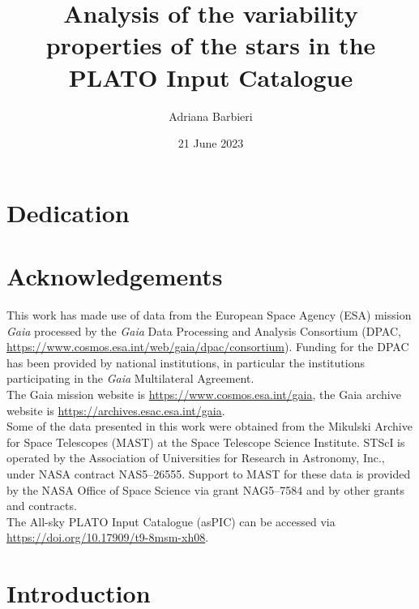 \documentclass[11pt]{report}
\title{Analysis of the variability properties of the stars in the PLATO Input Catalogue}
\author{Adriana Barbieri}
\date{21 June 2023}
\begin{document}





\chapter*{Dedication}




\chapter*{Acknowledgements}



This work has made use of data from the European Space Agency (ESA) mission {\it Gaia} %
processed by the {\it Gaia} Data Processing and Analysis Consortium (DPAC,
\url{https://www.cosmos.esa.int/web/gaia/dpac/consortium}). Funding for the DPAC
has been provided by national institutions, in particular the institutions
participating in the {\it Gaia} Multilateral Agreement.\\
The Gaia mission website is \url{https://www.cosmos.esa.int/gaia}, the Gaia archive website is \url{https://archives.esac.esa.int/gaia}.\\
Some of the data presented in this work were obtained from the Mikulski Archive for Space Telescopes (MAST) at the Space Telescope Science Institute.  STScI is operated by the Association of Universities for Research in Astronomy, Inc., under NASA contract NAS5–26555. Support to MAST for these data is provided by the NASA Office of Space Science via grant NAG5–7584 and by other grants and contracts.\\
The All-sky PLATO Input Catalogue (asPIC) can be accessed via \url{https://doi.org/10.17909/t9-8msm-xh08}.

\tableofcontents


\listoffigures


\listoftables

\doublespacing
\chapter*{Introduction}
\end{document}
